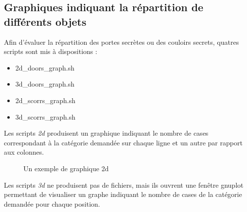 \documentclass[10pt,a4paper]{report}
\begin{document}
\subsection{Graphiques indiquant la répartition de différents objets}
Afin d'évaluer la répartition des portes secrètes ou des couloirs secrets,
quatres scripts sont mis à dispositions :

\begin{itemize}
\item 2d\_doors\_graph.sh
\item 3d\_doors\_graph.sh
\item 2d\_scorrs\_graph.sh
\item 3d\_scorrs\_graph.sh
\end{itemize}

Les scripts \emph{2d} produisent un graphique indiquant le nombre de cases
correspondant à la catégorie demandée sur chaque ligne et un autre par rapport
aux colonnes. 

\begin{figure}[H]
	\caption{\label{fig:2d_graph} Un exemple de graphique 2d}
\end{figure}


Les scripts \emph{3d} ne produisent pas de fichiers, mais ils ouvrent une
fenêtre gnuplot permettant de visualiser un graphe indiquant le nombre de cases
de la catégorie demandée pour chaque position. 
\end{document}

